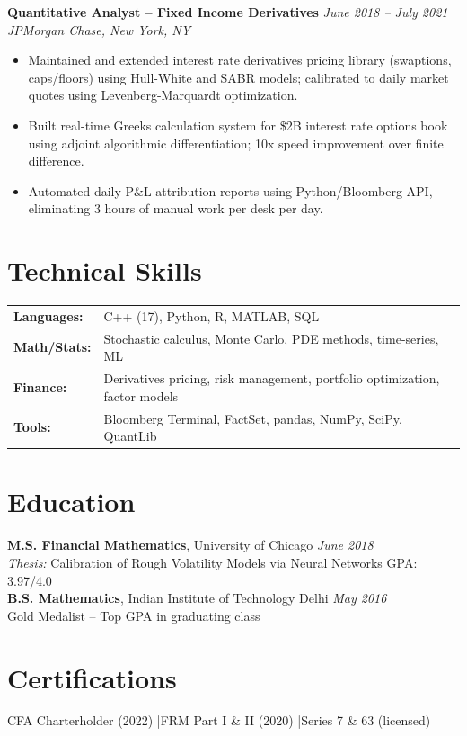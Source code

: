 \documentclass[11pt,a4paper]{article}
\begin{document}
\vspace{4pt}
\noindent\textbf{Quantitative Analyst -- Fixed Income Derivatives} \hfill \textit{June 2018 -- July 2021}\\
\textit{JPMorgan Chase, New York, NY}
\begin{itemize}
  \item Maintained and extended interest rate derivatives pricing library (swaptions, caps/floors) using Hull-White and SABR models; calibrated to daily market quotes using Levenberg-Marquardt optimization.
  \item Built real-time Greeks calculation system for \$2B interest rate options book using adjoint algorithmic differentiation; 10x speed improvement over finite difference.
  \item Automated daily P\&L attribution reports using Python/Bloomberg API, eliminating 3 hours of manual work per desk per day.
\end{itemize}

\section{Technical Skills}
\begin{tabular}{@{}ll}
\textbf{Languages:}        & C++ (17), Python, R, MATLAB, SQL \\
\textbf{Math/Stats:}       & Stochastic calculus, Monte Carlo, PDE methods, time-series, ML \\
\textbf{Finance:}          & Derivatives pricing, risk management, portfolio optimization, factor models \\
\textbf{Tools:}            & Bloomberg Terminal, FactSet, pandas, NumPy, SciPy, QuantLib \\
\end{tabular}

\section{Education}
\textbf{M.S. Financial Mathematics}, University of Chicago \hfill \textit{June 2018}\\
\textit{Thesis:} Calibration of Rough Volatility Models via Neural Networks \quad GPA: 3.97/4.0\\[3pt]
\textbf{B.S. Mathematics}, Indian Institute of Technology Delhi \hfill \textit{May 2016}\\
Gold Medalist -- Top GPA in graduating class

\section{Certifications}
CFA Charterholder (2022) \quad|\quad FRM Part I \& II (2020) \quad|\quad Series 7 \& 63 (licensed)
\end{document}
